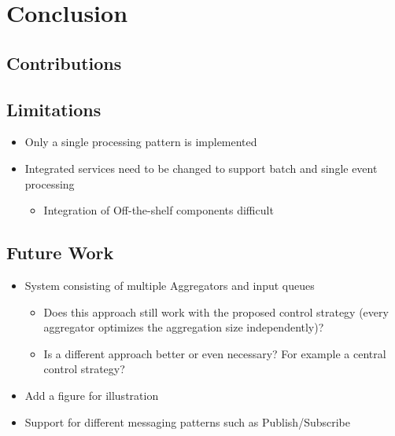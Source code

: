 \chapter{Conclusion}\label{ch:conclusion}

\section{Contributions}

\section{Limitations}

\begin{itemize}
	\item Only a single processing pattern is implemented
	\item Integrated services need to be changed to support batch and single event processing
	\begin{itemize}
		\item Integration of Off-the-shelf components difficult
	\end{itemize}
\end{itemize}

\section{Future Work}

\begin{itemize}
	\item System consisting of multiple Aggregators and input queues
	\begin{itemize}
		\item Does this approach still work with the proposed control strategy (every aggregator optimizes the aggregation size independently)?
		\item Is a different approach better or even necessary? For example a central control strategy?
	\end{itemize}
	\item Add a figure for illustration
	\item Support for different messaging patterns such as Publish/Subscribe
\end{itemize}